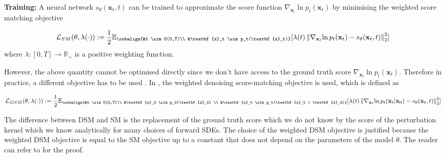 
\textbf{Training:} A neural network $s_\theta(\textbf{x}_t,t)$ can be trained to approximate the score function $\nabla_{\textbf{x}_t}{\ln{p_t(\textbf{x}_t)}}$ by minimising the weighted score matching objective

\begin{gather}
\begin{aligned}
    \mathcal{L}_{SM}(\theta, \lambda(\cdot)) := 
    \frac{1}{2} \mathbb{E}_{\subalign{&t \sim U(0,T)\\ &\textbf{x}_t \sim p_t(\textbf{x}_t)}} [\lambda(t) \norm{\nabla_{\textbf{x}_t}{\ln{p_t(\textbf{x}_t)}} - s_\theta(\textbf{x}_t,t)}_2^2]
\end{aligned}
\end{gather}
where $\lambda: [0,T] \xrightarrow{} \mathbb{R}_+$ is a positive weighting function.

However, the above quantity cannot be optimised directly since we don't have access to the ground truth score $\nabla_{\textbf{x}_t}{\ln{p_t(\textbf{x}_t)}}$. Therefore in practice, a different objective has to be used \cite{score_matching, vincent2011connection, song2020score}. In \cite{song2020score}, the weighted denoising score-matching objective is used, which is defined as 

\begin{gather}\label{ch3:DSM_for_uniform_diffusion_models}
\begin{aligned}
    \mathcal{L}_{DSM}(\theta, \lambda(\cdot)) := 
    \frac{1}{2} \mathbb{E}_{\subalign{&t \sim U(0,T)\\ &\textbf{x}_0 \sim p_0(\textbf{x}_0) \\ &\textbf{x}_t \sim p_t(\textbf{x}_t | \textbf{x}_0)}} [\lambda(t) \norm{\nabla_{\textbf{x}_t}{\ln{p_t(\textbf{x}_t | \textbf{x}_0)}} - s_\theta(\textbf{x}_t,t)}_2^2]
\end{aligned}
\end{gather}

The difference between DSM and SM is the replacement of the ground truth score which we do not know by the score of the perturbation kernel which we know analytically for many choices of forward SDEs. The choice of the weighted DSM objective is justified because the weighted DSM objective is equal to the SM objective up to a constant that does not depend on the parameters of the model $\theta$. The reader can refer to \cite{vincent2011connection} for the proof. 

